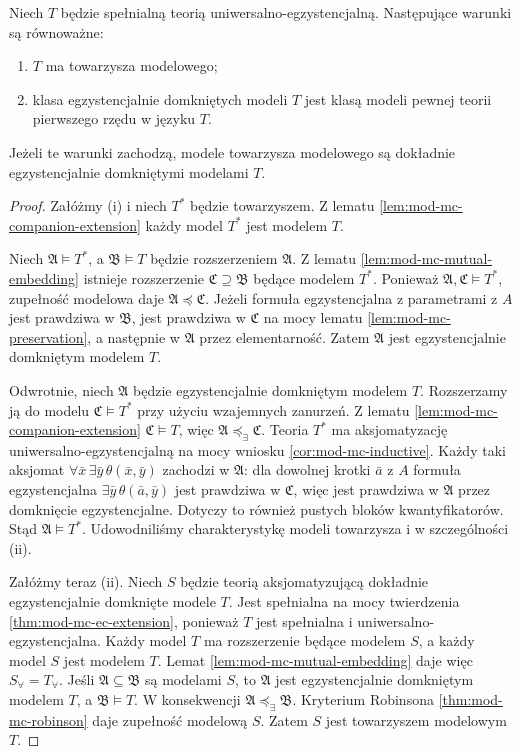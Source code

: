 \begin{twierdzenie}
\label{thm:mod-mc-companion-ec}
Niech $T$ będzie spełnialną teorią
uniwersalno-egzystencjalną. Następujące warunki
są równoważne:
\begin{enumerate}[label=(\roman*)]
\item $T$ ma towarzysza modelowego;
\item klasa egzystencjalnie domkniętych modeli $T$
jest klasą modeli pewnej teorii pierwszego rzędu
w języku $T$.
\end{enumerate}
Jeżeli te warunki zachodzą, modele towarzysza
modelowego są dokładnie egzystencjalnie domkniętymi
modelami $T$.
\end{twierdzenie}
\begin{proof}
Załóżmy (i) i niech $T^*$ będzie towarzyszem.
Z lematu \ref{lem:mod-mc-companion-extension}
każdy model $T^*$ jest modelem $T$.

Niech $\mathfrak A\models T^*$, a
$\mathfrak B\models T$ będzie rozszerzeniem
$\mathfrak A$. Z lematu \ref{lem:mod-mc-mutual-embedding}
istnieje rozszerzenie $\mathfrak C\supseteq\mathfrak B$
będące modelem $T^*$.
Ponieważ $\mathfrak A,\mathfrak C\models T^*$,
zupełność modelowa daje
$\mathfrak A\preccurlyeq\mathfrak C$.
Jeżeli formuła egzystencjalna z parametrami z $A$
jest prawdziwa w $\mathfrak B$, jest prawdziwa
w $\mathfrak C$ na mocy lematu
\ref{lem:mod-mc-preservation}, a następnie
w $\mathfrak A$ przez elementarność.
Zatem $\mathfrak A$ jest egzystencjalnie domkniętym
modelem $T$.

Odwrotnie, niech $\mathfrak A$ będzie egzystencjalnie
domkniętym modelem $T$. Rozszerzamy ją do modelu
$\mathfrak C\models T^*$ przy użyciu wzajemnych
zanurzeń. Z lematu \ref{lem:mod-mc-companion-extension}
$\mathfrak C\models T$, więc
$\mathfrak A\preccurlyeq_{\exists}\mathfrak C$.
Teoria $T^*$ ma aksjomatyzację
uniwersalno-egzystencjalną na mocy wniosku
\ref{cor:mod-mc-inductive}.
Każdy taki aksjomat
$\forall\bar x\,\exists\bar y\,\theta(\bar x,\bar y)$
zachodzi w $\mathfrak A$: dla dowolnej krotki
$\bar a$ z $A$ formuła egzystencjalna
$\exists\bar y\,\theta(\bar a,\bar y)$ jest
prawdziwa w $\mathfrak C$, więc jest prawdziwa
w $\mathfrak A$ przez domknięcie egzystencjalne.
Dotyczy to również pustych bloków kwantyfikatorów.
Stąd $\mathfrak A\models T^*$.
Udowodniliśmy charakterystykę modeli towarzysza
i w szczególności (ii).

Załóżmy teraz (ii). Niech $S$ będzie teorią
aksjomatyzującą dokładnie egzystencjalnie domknięte
modele $T$. Jest spełnialna na mocy twierdzenia
\ref{thm:mod-mc-ec-extension}, ponieważ $T$ jest
spełnialna i uniwersalno-egzystencjalna.
Każdy model $T$ ma rozszerzenie będące modelem $S$,
a każdy model $S$ jest modelem $T$.
Lemat \ref{lem:mod-mc-mutual-embedding} daje więc
$S_{\forall}=T_{\forall}$.
Jeśli $\mathfrak A\subseteq\mathfrak B$ są modelami $S$,
to $\mathfrak A$ jest egzystencjalnie domkniętym
modelem $T$, a $\mathfrak B\models T$.
W konsekwencji $\mathfrak A\preccurlyeq_{\exists}
\mathfrak B$. Kryterium Robinsona
\ref{thm:mod-mc-robinson} daje zupełność modelową $S$.
Zatem $S$ jest towarzyszem modelowym $T$.
\end{proof}

